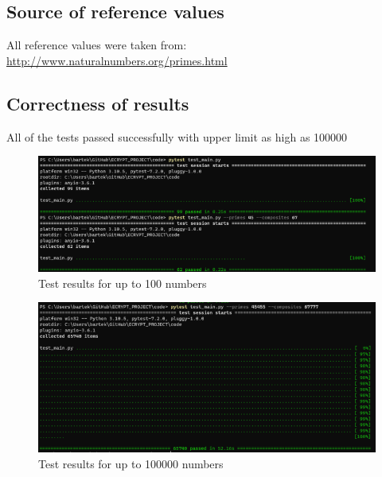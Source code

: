 \documentclass[12pt]{article}
\begin{document}
\subsection{Source of reference values}
All reference values were taken from: \href{http://www.naturalnumbers.org/primes.html}{http://www.naturalnumbers.org/primes.html}

\subsection{Correctness of results}
All of the tests passed successfully with upper limit as high as 100000

\begin{figure}[H]
    \caption{Test results for up to 100 numbers}
\centering
\includegraphics[width=\textwidth]
{screenshoot/tests100.png}
\end{figure}


\begin{figure}[H]
    \caption{Test results for up to 100000 numbers}
\centering
\includegraphics[width=\textwidth]
{screenshoot/tests100000.png}
\end{figure}
\end{document}
